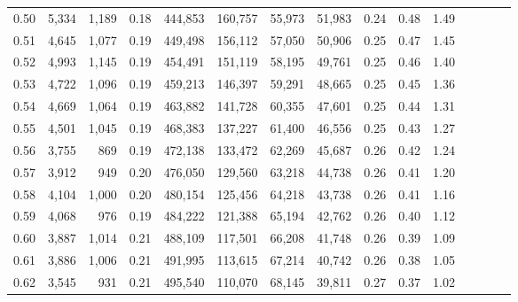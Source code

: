 \begin{tabular}{rrrcrrrrrrrrrrr}
0.50 &   5,334 &   1,189 &                                       0.18 &  444,853 &  160,757 &   55,973 &   51,983 &  0.24 &  0.48 &                         1.49 \\
0.51 &   4,645 &   1,077 &                                       0.19 &  449,498 &  156,112 &   57,050 &   50,906 &  0.25 &  0.47 &                         1.45 \\
0.52 &   4,993 &   1,145 &                                       0.19 &  454,491 &  151,119 &   58,195 &   49,761 &  0.25 &  0.46 &                         1.40 \\
0.53 &   4,722 &   1,096 &                                       0.19 &  459,213 &  146,397 &   59,291 &   48,665 &  0.25 &  0.45 &                         1.36 \\
0.54 &   4,669 &   1,064 &                                       0.19 &  463,882 &  141,728 &   60,355 &   47,601 &  0.25 &  0.44 &                         1.31 \\
0.55 &   4,501 &   1,045 &                                       0.19 &  468,383 &  137,227 &   61,400 &   46,556 &  0.25 &  0.43 &                         1.27 \\
0.56 &   3,755 &     869 &                                       0.19 &  472,138 &  133,472 &   62,269 &   45,687 &  0.26 &  0.42 &                         1.24 \\
0.57 &   3,912 &     949 &                                       0.20 &  476,050 &  129,560 &   63,218 &   44,738 &  0.26 &  0.41 &                         1.20 \\
0.58 &   4,104 &   1,000 &                                       0.20 &  480,154 &  125,456 &   64,218 &   43,738 &  0.26 &  0.41 &                         1.16 \\
0.59 &   4,068 &     976 &                                       0.19 &  484,222 &  121,388 &   65,194 &   42,762 &  0.26 &  0.40 &                         1.12 \\
0.60 &   3,887 &   1,014 &                                       0.21 &  488,109 &  117,501 &   66,208 &   41,748 &  0.26 &  0.39 &                         1.09 \\
0.61 &   3,886 &   1,006 &                                       0.21 &  491,995 &  113,615 &   67,214 &   40,742 &  0.26 &  0.38 &                         1.05 \\
0.62 &   3,545 &     931 &                                       0.21 &  495,540 &  110,070 &   68,145 &   39,811 &  0.27 &  0.37 &                         1.02 \\

\end{tabular}
